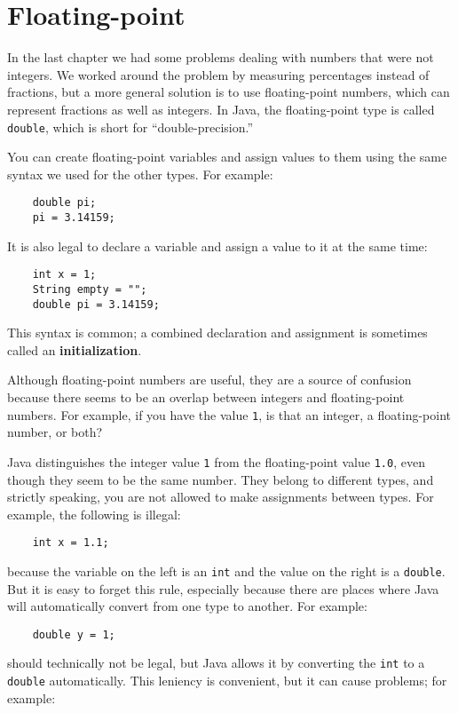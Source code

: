 \documentclass[12pt]{book}
\theoremstyle{definition}
\begin{document}
\section{Floating-point}

In the last chapter we had some problems dealing with numbers
that were not integers.  We worked around the problem by measuring
percentages instead of fractions, but a more general solution is
to use floating-point numbers, which can represent fractions
as well as integers.  In Java, the floating-point type is
called {\tt double}, which is short for ``double-precision.''

You can create floating-point variables and assign values to them
using the same syntax we used for the other types.  For example:

\begin{lstlisting}
    double pi;
    pi = 3.14159;
\end{lstlisting}
%
It is also legal to declare a variable and assign a value to it at the
same time:

\begin{lstlisting}
    int x = 1;
    String empty = "";
    double pi = 3.14159;
\end{lstlisting}
%
This syntax is common; a combined declaration
and assignment is sometimes called an {\bf initialization}.

Although floating-point numbers are useful, they are
a source of confusion because there seems to be an
overlap between integers and floating-point numbers.  For
example, if you have the value {\tt 1}, is that an integer,
a floating-point number, or both?

Java distinguishes the integer value {\tt 1}
from the floating-point value {\tt 1.0}, even though they
seem to be the same number.  They belong to
different types, and strictly speaking, you are not allowed
to make assignments between types.  For example, the following
is illegal:

\begin{lstlisting}
    int x = 1.1;
\end{lstlisting}
%
because the variable on the left is an {\tt int}
and the value on the right is a {\tt double}.  But it is easy
to forget this rule, especially because there are places where Java
will automatically convert from one type to another.
For example:

\begin{lstlisting}
    double y = 1;
\end{lstlisting}
%
should technically not be legal, but Java allows it by converting the
{\tt int} to a {\tt double} automatically.  This leniency is
convenient, but it can cause problems; for example:
\end{document}
